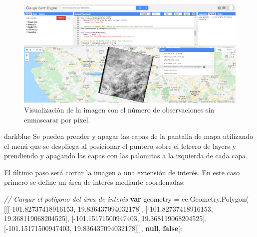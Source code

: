 \documentclass[
  12pt,
  letterpaper,
  twoside]{book}
\newenvironment{Shaded}{\begin{snugshade}}{\end{snugshade}}
\newcommand{\AttributeTok}[1]{\textcolor[rgb]{0.48,0.12,0.64}{#1}}
\newcommand{\CommentTok}[1]{\textcolor[rgb]{0.24,0.58,0.00}{\textit{#1}}}
\newcommand{\FloatTok}[1]{\textcolor[rgb]{0.28,0.53,0.93}{#1}}
\newcommand{\FunctionTok}[1]{\textcolor[rgb]{0.48,0.12,0.64}{#1}}
\newcommand{\KeywordTok}[1]{\textcolor[rgb]{0.00,0.00,0.00}{\textbf{#1}}}
\newcommand{\NormalTok}[1]{#1}
\newcommand{\OperatorTok}[1]{\textcolor[rgb]{0.00,0.00,0.00}{#1}}
\begin{document}
\begin{figure}[H]

{\centering \includegraphics[width=0.95\linewidth]{Img/imCount} 

}

\caption{Visualización de la imagen con el número de observaciones sin enmascarar por píxel.}\label{fig:f1021}
\end{figure}

\begin{bluebox2}

\begin{awesomeblock}{5pt}{\faLightbulb}{darkblue}
Se pueden prender y apagar las capas de la pantalla de mapa utilizando el menú que se despliega al posicionar el puntero sobre el letrero de layers y prendiendo y apagando las capas con las palomitas a la izquierda de cada capa.

\end{awesomeblock}

\end{bluebox2}

El último paso será cortar la imagen a una extensión de interés. En este caso primero se define un área de interés mediante coordenadas:

\begin{Shaded}
\begin{Highlighting}[]
\CommentTok{// Cargar el polígono del área de interés}
\KeywordTok{var}\NormalTok{ geometry }\OperatorTok{=}\NormalTok{ ee}\OperatorTok{.}\AttributeTok{Geometry}\OperatorTok{.}\FunctionTok{Polygon}\NormalTok{(}
\NormalTok{        [[[}\OperatorTok{{-}}\FloatTok{101.82737418916153}\OperatorTok{,} \FloatTok{19.836437094032178}\NormalTok{]}\OperatorTok{,}
\NormalTok{          [}\OperatorTok{{-}}\FloatTok{101.82737418916153}\OperatorTok{,} \FloatTok{19.368119068204525}\NormalTok{]}\OperatorTok{,}
\NormalTok{          [}\OperatorTok{{-}}\FloatTok{101.15171500947403}\OperatorTok{,} \FloatTok{19.368119068204525}\NormalTok{]}\OperatorTok{,}
\NormalTok{          [}\OperatorTok{{-}}\FloatTok{101.15171500947403}\OperatorTok{,} \FloatTok{19.836437094032178}\NormalTok{]]]}\OperatorTok{,} \KeywordTok{null}\OperatorTok{,} \KeywordTok{false}\NormalTok{)}\OperatorTok{;}
\end{Highlighting}
\end{Shaded}
\end{document}
